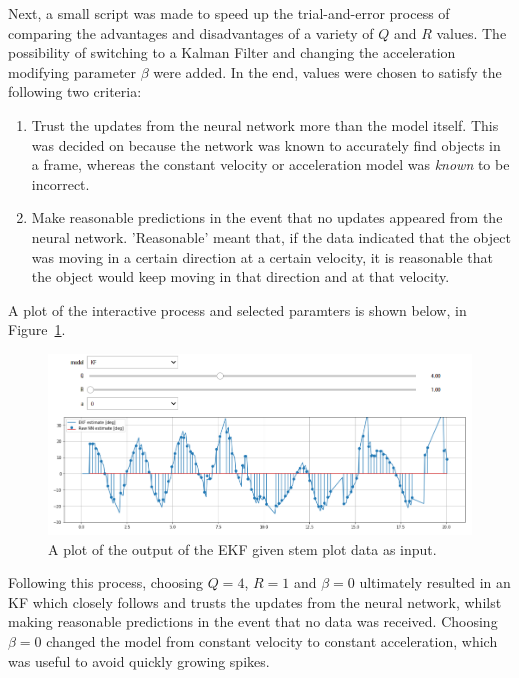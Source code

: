 Next, a small script was made to speed up the trial-and-error process of comparing the advantages and disadvantages of a variety of $Q$ and $R$ values. The possibility of switching to a Kalman Filter and changing the acceleration modifying parameter $\beta$ were added. In the end, values were chosen to satisfy the following two criteria:

\begin{enumerate}
\item Trust the updates from the neural network more than the model itself. This was decided on because the network was known to accurately find objects in a frame, whereas the constant velocity or acceleration model was \emph{known} to be incorrect.
\item Make reasonable predictions in the event that no updates appeared from the neural network. 'Reasonable' meant that, if the data indicated that the object was moving in a certain direction at a certain velocity, it is reasonable that the object would keep moving in that direction and at that velocity.
\end{enumerate}

A plot of the interactive process and selected paramters is shown below, in Figure~\ref{fig:tuning_Q_R}.

\begin{figure}[h!]
  \centering
  \includegraphics[width=\textwidth]{methodology/tuning_Q_R}
  \caption{\label{fig:tuning_Q_R} A plot of the output of the EKF given stem plot data as input.}
\end{figure}

Following this process, choosing $Q = 4$, $R = 1$ and $\beta = 0$ ultimately resulted in an KF which closely follows and trusts the updates from the neural network, whilst making reasonable predictions in the event that no data was received. Choosing $\beta = 0$ changed the model from constant velocity to constant acceleration, which was useful to avoid quickly growing spikes.


